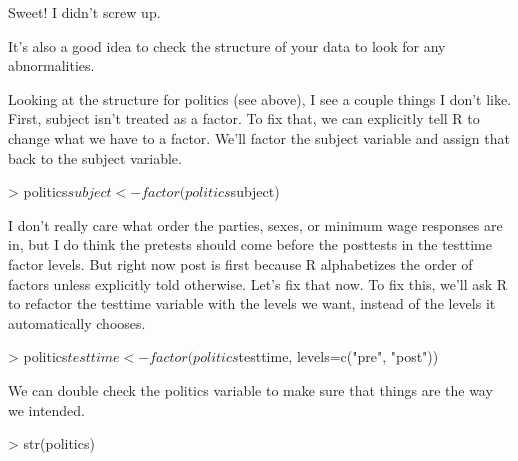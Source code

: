 \documentclass[12pt]{article}
\begin{document}
Sweet! I didn't screw up.

It's also a good idea to check the structure of your data to look for any
abnormalities.

Looking at the structure for politics (see above), I see a couple things I
don't like. First, subject isn't treated as a factor. To fix that, we can
explicitly tell R to change what we have to a factor. We'll factor the subject
variable and assign that back to the subject variable.

\begin{Schunk}
\begin{Sinput}
> politics$subject<-factor(politics$subject)
\end{Sinput}
\end{Schunk}

I don't really care what order the parties, sexes, or minimum wage responses are
in, but I do think the pretests should come before the posttests in the testtime
factor levels. But right now post is first because R alphabetizes the order of
factors unless explicitly told otherwise. Let's fix that now. To fix this, we'll
ask R to refactor the testtime variable with the levels we want, instead of the
levels it automatically chooses.

\begin{Schunk}
\begin{Sinput}
> politics$testtime<-factor(politics$testtime, levels=c("pre", "post"))
\end{Sinput}
\end{Schunk}

We can double check the politics variable to make sure that things are the
way we intended.

\begin{Schunk}
\begin{Sinput}
> str(politics)
\end{Sinput}
\end{Schunk}
\end{document}
